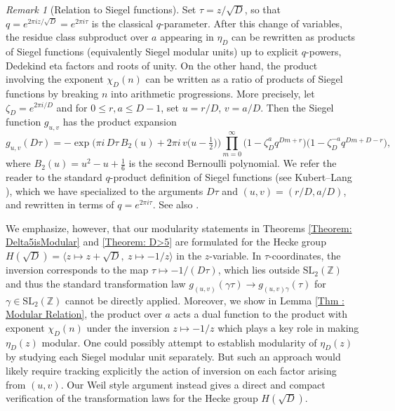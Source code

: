 \documentclass[11pt]{amsart}
\numberwithin{equation}{section}
\theoremstyle{remark}
\newtheorem{rem}[thm]{Remark}
\begin{document}
\begin{rem}[Relation to Siegel functions]\label{rem:siegel-context}
Set $\tau=z/\sqrt D$, so that $q=e^{2\pi i z/\sqrt D}=e^{2\pi i\tau}$ is the classical $q$-parameter.
After this change of variables, the residue class subproduct over $a$ appearing in $\eta_D$
can be rewritten as products of Siegel functions (equivalently Siegel modular units)
up to explicit $q$-powers, Dedekind eta factors and roots of unity. On the other hand, the product involving the exponent $\chi_D(n)$ can be written as a ratio of products of Siegel functions by breaking $n$ into arithmetic progressions. More precisely, let $\zeta_D=e^{2\pi i/D}$ and for $0\le r,a\le D-1$, set $u=r/D$, $v=a/D$. Then the Siegel function $g_{u,v}$ has the product expansion
\[
g_{u,v}(D\tau)
= -\exp\!\Big(\pi i\,D\tau\,B_2(u)+2\pi i\,v\Big(u-\tfrac12\Big)\Big)
\prod_{m=0}^{\infty}\bigl(1-\zeta_D^{a}q^{Dm+r}\bigr)\bigl(1-\zeta_D^{-a}q^{Dm+D-r}\bigr),
\]
where $B_2(u)=u^2-u+\tfrac16$ is the second Bernoulli polynomial. We refer the reader to the standard $q$-product definition of Siegel functions (see Kubert--Lang \cite[Ch.2]{KubertLang}), which we have
specialized to the arguments $D\tau$ and $(u,v)=(r/D,a/D)$, and rewritten in terms of $q=e^{2\pi i\tau}$. See also \cite[Eq.~(15), Pg.~13]{brunault2023modularregulatorsmultipleeisenstein}.

We emphasize, however, that our modularity statements in Theorems \ref{Theorem: Delta5isModular} and \ref{Theorem: D>5} are formulated for the Hecke group
$H(\sqrt D)=\langle z\mapsto z+\sqrt D,\ z\mapsto -1/z\rangle$ in the $z$-variable.
In $\tau$-coordinates, the inversion corresponds to the map $\tau\mapsto -1/(D\tau)$,
which lies outside $\mathrm{SL}_2(\mathbb Z)$ and thus the standard transformation law $g_{(u,v)}(\gamma\tau) \to g_{(u,v)\gamma}(\tau)$ for $\gamma\in\mathrm{SL}_2(\mathbb Z)$ cannot be directly applied. Moreover, we show in Lemma \ref{Thm : Modular Relation}, the product over $a$ acts a dual function to the product with exponent $\chi_D(n)$ under the inversion $z\mapsto -1/z$ which plays a key role in making $\eta_D(z)$ modular. One could possibly attempt to establish modularity of $\eta_D(z)$ by studying each Siegel modular unit separately. But such an approach would likely require tracking explicitly the action of inversion on each factor arising from $(u,v)$. Our Weil style argument instead gives a direct and compact verification of the transformation laws for the Hecke group $H(\sqrt{D})$.
\end{rem}
\end{document}
